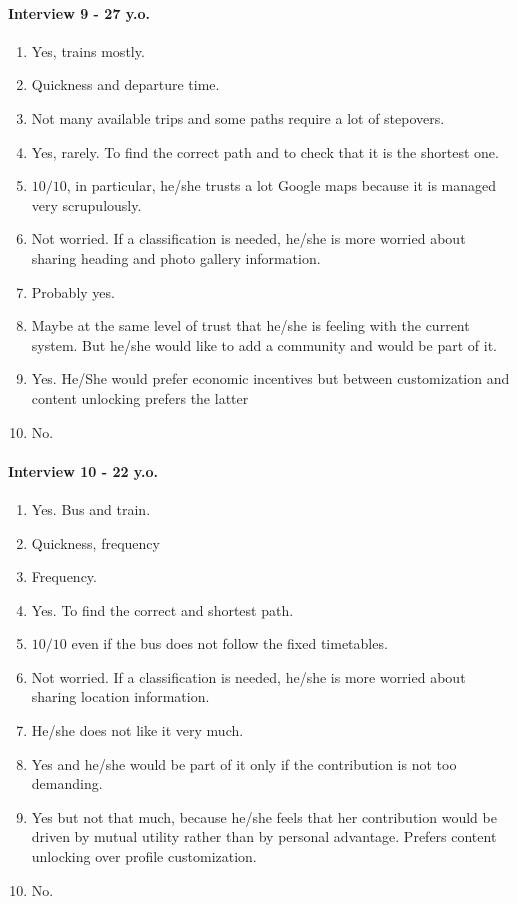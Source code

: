 \documentclass[a4paper, 10pt]{article}
\begin{document}
\paragraph*{Interview 9 - 27 y.o.}

\begin{enumerate}
    \item Yes, trains mostly.
    \item Quickness and departure time.
    \item Not many available trips and some paths require a lot of stepovers.
    \item Yes, rarely. To find the correct path and to check that it is the shortest one.
    \item $10/10$, in particular, he/she trusts a lot Google maps because it is managed very scrupulously.
    \item Not worried. If a classification is needed, he/she is more worried about sharing heading and photo gallery information.
    \item Probably yes.
    \item Maybe at the same level of trust that he/she is feeling with the current system. But he/she would like to add a community and would be part of it.
    \item Yes. He/She would prefer economic incentives but between customization and content unlocking prefers the latter
    \item No.
\end{enumerate}

\paragraph*{Interview 10 - 22 y.o.}
\begin{enumerate}
    \item Yes. Bus and train.
    \item Quickness, frequency
    \item Frequency.
    \item Yes. To find the correct and shortest path.
    \item $10/10$ even if the bus does not follow the fixed timetables.
    \item Not worried.  If a classification is needed, he/she is more worried about sharing location information.
    \item He/she does not like it very much.
    \item Yes and he/she would be part of it only if the contribution is not too demanding.
    \item Yes but not that much, because he/she feels that her contribution would be driven by mutual utility rather than by personal advantage. Prefers content unlocking over profile customization.
    \item No.
\end{enumerate}
\end{document}
